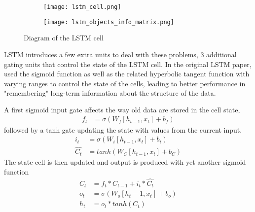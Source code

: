 \begin{figure}[H]
    \centering
    \begin{subfigure}{.5\textwidth}
        \centering
        \texttt{[image: lstm\_cell.png]}
        \label{tab:lstm_cell}
    \end{subfigure}%
    \centering
    \begin{subfigure}{.5\textwidth}
        \centering
        \texttt{[image: lstm\_objects\_info\_matrix.png]}
        \label{tab:lstm_cell_info}
    \end{subfigure}
    \caption{Diagram of the LSTM cell}
\end{figure}
LSTM introduces a few extra units to deal with these problems, 3 additional gating units that control the state of the LSTM cell. In the original LSTM paper, \citeauthor{lstm} used the sigmoid function as well as the related hyperbolic tangent function with varying ranges to control the state of the cells, leading to better performance in "remembering" long-term information about the structure of the data.

A first sigmoid input gate affects the way old data are stored in the cell state,
\begin{align}
    f_t &= \sigma\left( W_f [h_{t-1}, x_t] + b_f \right)    
\end{align} 
followed by a tanh gate updating the state with values from the current input.
\begin{align}
    i_t &= \sigma\left( W_i [h_{t-1}, x_t] + b_i \right) \\
    \hat{C_t} &= tanh\left(W_C [h_{t-1}, x_t] + b_C\right)
\end{align}
The state cell is then updated and output is produced with yet another sigmoid function
\begin{align}
    C_t &= f_t * C_{t-1} + i_t * \hat{C_t} \\
    o_t &= \sigma \left(W_o [h_t-1, x_t] + b_o\right) \\
    h_t &= o_t * tanh(C_t)
\end{align}